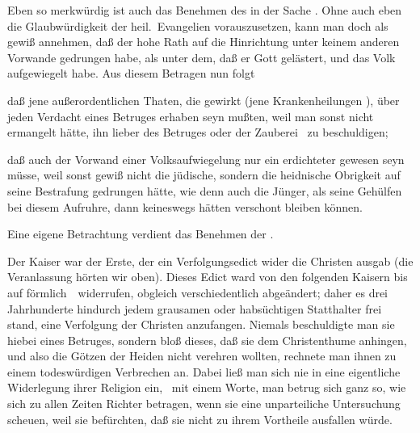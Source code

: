 \begin{aufza}
\item Eben so merkwürdig ist auch das Benehmen des  in der Sache . Ohne auch eben die Glaubwürdigkeit der heil.\ Evangelien vorauszusetzen, kann man doch als gewiß annehmen, daß der hohe Rath auf die Hinrichtung  unter keinem anderen Vorwande gedrungen habe, als unter dem, daß er Gott gelästert, und das Volk aufgewiegelt habe. Aus diesem Betragen nun folgt
\begin{aufzb}
\item daß jene außerordentlichen Thaten, die  gewirkt (jene Krankenheilungen \usw ), über jeden Verdacht eines Betruges erhaben seyn mußten, weil man sonst nicht ermangelt hätte, ihn lieber des Betruges oder der Zauberei \udgl\ zu beschuldigen;
\item daß auch der Vorwand einer Volksaufwiegelung nur ein erdichteter gewesen seyn müsse, weil sonst gewiß nicht die jüdische, sondern die heidnische Obrigkeit auf seine Bestrafung gedrungen hätte, wie denn auch die Jünger, als seine Gehülfen bei diesem Aufruhre, dann keineswegs hätten verschont bleiben können.
\end{aufzb}
\item Eine eigene Betrachtung verdient das Benehmen der .
\begin{aufzb}
\item Der Kaiser  war der Erste, der ein Verfolgungsedict wider die Christen ausgab (die Veranlassung hörten wir oben). Dieses Edict ward von den folgenden Kaisern bis auf   förmlich~\ widerrufen, obgleich verschiedentlich abgeändert; daher es drei Jahrhunderte hindurch jedem grausamen oder habsüchtigen Statthalter frei stand, eine Verfolgung der Christen anzufangen. Niemals beschuldigte man sie hiebei eines Betruges, sondern bloß dieses, daß sie dem Christenthume anhingen, und also die Götzen der Heiden nicht verehren wollten, rechnete man ihnen zu einem todeswürdigen Verbrechen an. Dabei ließ man sich nie in eine eigentliche Widerlegung ihrer Religion ein, \dh\ mit einem Worte, man betrug sich ganz so, wie sich zu allen Zeiten Richter betragen, wenn sie eine unparteiliche Untersuchung scheuen, weil sie befürchten, daß sie nicht zu ihrem Vortheile ausfallen würde.

\end{aufzb}
\end{aufza}
